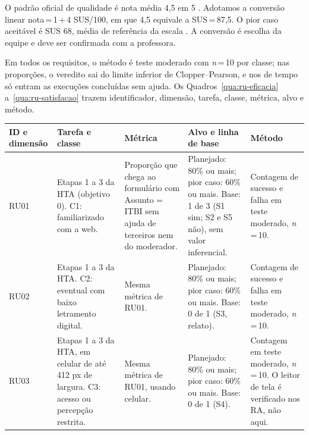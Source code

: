 \documentclass[
  12pt,
  oneside,
  a4paper,
  chapter=TITLE,
  section=TITLE,
  english,
  brazilian
]{abntex2}
\renewcommand{\fonte}[1]{\par\vspace{3pt}{\footnotesize\raggedright\noindent Fonte: #1\par}\vspace{4pt}}%
\newcommand{\rudim}{}
\newcommand{\rulinha}[5]{%
  #1\newline\rudim & #2 & #3 & #4 & #5 \\\hline}
\begin{document}
O padrão oficial de qualidade é nota média 4,5 em
5 \cite{padroesqualidade}. Adotamos a conversão linear
nota\,=\,1\,+\,4\,\texttimes\,SUS/100, em que 4,5 equivale a SUS\,=\,87,5. O
pior caso aceitável é SUS 68, média de referência da escala \cite{sauro2016}. A
conversão é escolha da equipe e deve ser confirmada com a professora.

Em todos os requisitos, o método é teste moderado com \textit{n}\,=\,10 por classe; nas
proporções, o veredito sai do limite inferior de Clopper--Pearson, e nos de
tempo só entram as execuções concluídas sem ajuda. Os Quadros~\ref{qua:ru-eficacia}
a~\ref{qua:ru-satisfacao} trazem identificador, dimensão, tarefa, classe,
métrica, alvo e método.

\begin{quadro}[!htb]
  \caption{Requisitos de eficácia (RU01 a RU03)}\label{qua:ru-eficacia}
  \centering\footnotesize\renewcommand{\rudim}{Eficácia}
  \begin{tabularx}{\textwidth}{|P{1.7cm}|Y|Y|Y|Y|}\hline
    ID e dimensão & Tarefa e classe & Métrica & Alvo e linha de base & Método \\\hline
    \rulinha{RU01}{Etapas 1 a 3 da HTA (objetivo 0). C1: familiarizado com a web.}{Proporção que chega ao formulário com Assunto = ITBI sem ajuda de terceiros nem do moderador.}{Planejado: 80\% ou mais; pior caso: 60\% ou mais. Base: 1 de 3 (S1 sim; S2 e S5 não), sem valor inferencial.}{Contagem de sucesso e falha em teste moderado, \textit{n}\,=\,10.}
    \rulinha{RU02}{Etapas 1 a 3 da HTA. C2: eventual com baixo letramento digital.}{Mesma métrica de RU01.}{Planejado: 80\% ou mais; pior caso: 60\% ou mais. Base: 0 de 1 (S3, relato).}{Contagem de sucesso e falha em teste moderado, \textit{n}\,=\,10.}
    \rulinha{RU03}{Etapas 1 a 3 da HTA, em celular de até 412 px de largura. C3: acesso ou percepção restrita.}{Mesma métrica de RU01, usando celular.}{Planejado: 80\% ou mais; pior caso: 60\% ou mais. Base: 0 de 1 (S4).}{Contagem em teste moderado, \textit{n}\,=\,10. O leitor de tela é verificado nos RA, não aqui.}
  \end{tabularx}
  \fonte{Elaborado pelos autores (2026).}
\end{quadro}\FloatBarrier
\end{document}

